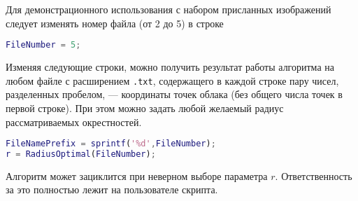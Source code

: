 
Для демонстрационного использования с набором присланных изображений следует изменять номер файла (от 2 до 5) в строке 
\begin{lstlisting}[language=matlab, frame=lines]
FileNumber = 5;
\end{lstlisting}

Изменяя следующие строки, можно получить результат работы алгоритма на любом файле с расширением \texttt{.txt}, содержащего в каждой строке пару чисел, разделенных пробелом, --- координаты точек облака (без общего числа точек в первой строке). При этом можно задать любой желаемый радиус рассматриваемых окрестностей. 
\begin{lstlisting}[language=matlab, frame=lines]
FileNamePrefix = sprintf('%d',FileNumber);
r = RadiusOptimal(FileNumber);
\end{lstlisting}
Алгоритм может зациклится при неверном выборе параметра $r$. Ответственность за это полностью лежит на пользователе скрипта.

